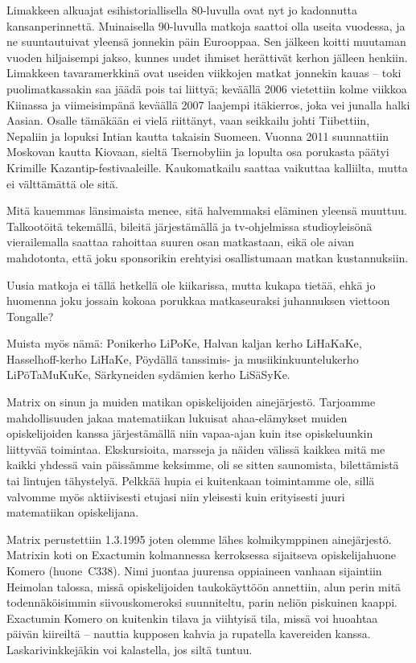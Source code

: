 \documentclass[a5paper, 8pt, twocolumn]{book} %
\numberwithin{equation}{section}
\begin{document}
Limakkeen alkuajat esihistoriallisella
80-luvulla ovat nyt jo kadonnutta kansanperinnettä.
Muinaisella 90-luvulla
matkoja saattoi olla useita vuodessa, ja
ne suuntautuivat yleensä jonnekin päin
Eurooppaa. Sen jälkeen koitti muutaman
vuoden hiljaisempi jakso, kunnes uudet
ihmiset herättivät kerhon jälleen henkiin.
Limakkeen tavaramerkkinä ovat useiden
viikkojen matkat jonnekin kauas -- toki
puolimatkassakin saa jäädä pois tai liittyä;
keväällä 2006 vietettiin kolme viikkoa
Kiinassa ja viimeisimpänä keväällä 2007
laajempi itäkierros, joka vei junalla halki
Aasian. Osalle tämäkään ei vielä riittänyt,
vaan seikkailu johti Tiibettiin, Nepaliin ja
lopuksi Intian kautta takaisin Suomeen.
Vuonna 2011 suunnattiin Moskovan kautta
Kiovaan, sieltä Tsernobyliin ja lopulta osa
porukasta päätyi Krimille Kazantip-festivaaleille.
Kaukomatkailu saattaa vaikuttaa
kalliilta, mutta ei välttämättä ole sitä.

Mitä kauemmas länsimaista menee, sitä
halvemmaksi eläminen yleensä muuttuu.
Talkootöitä tekemällä, bileitä järjestämällä
ja tv-ohjelmissa studio\-yleisönä vierailemalla
saattaa rahoittaa suuren osan matkastaan,
eikä ole aivan mahdotonta, että joku
sponsorikin erehtyisi osallistumaan matkan
kustannuksiin.

Uusia matkoja ei tällä hetkellä ole kiikarissa,
mutta kukapa tietää, ehkä jo huomenna
joku jossain kokoaa porukkaa matkaseuraksi
juhannuksen viettoon Tongalle?

Muista myös nämä: Ponikerho LiPoKe,
Halvan kaljan kerho LiHaKaKe, Hasselhoff-kerho LiHaKe, Pöydällä tanssimis- ja
musiikin\-kuuntelu\-kerho LiPöTaMuKuKe,
Särkyneiden sydämien kerho LiSäSyKe.

Matrix on sinun ja muiden matikan
opiskelijoiden ainejärjestö. Tarjoamme
mahdollisuuden jakaa matematiikan lukuisat
ahaa-elämykset muiden opiskelijoiden
kanssa järjestämällä niin vapaa-ajan
kuin itse opiskeluunkin liittyvää toimintaa.
Ekskursioita, marsseja ja näiden välissä
kaikkea mitä me kaikki yhdessä vain päissämme
keksimme, oli se sitten saunomista,
bilettämistä tai lintujen tähystelyä. Pelkkää
hupia ei kuitenkaan toimintamme ole, sillä
valvomme myös aktiivisesti etujasi niin
yleisesti kuin erityisesti juuri matematiikan
opiskelijana.

Matrix perustettiin 1.3.1995 joten olemme
lähes kolmikymppinen ainejärjestö. Matrixin
koti on Exactumin kolmannessa kerroksessa sijaitseva
opiskelijahuone Komero (huone~C338).
Nimi juontaa juurensa oppiaineen vanhaan
sijaintiin Heimolan talossa, missä opiskelijoiden
taukokäyttöön annettiin, alun perin
mitä todennäköisimmin siivouskomeroksi
suunniteltu, parin neliön piskuinen kaappi.
Exactumin Komero on kuitenkin tilava ja
viihtyisä tila, missä voi huoahtaa päivän
kiireiltä -- nauttia kupposen kahvia ja rupatella
kavereiden kanssa. Laskarivinkkejäkin
voi kalastella, jos siltä tuntuu.
\end{document}
